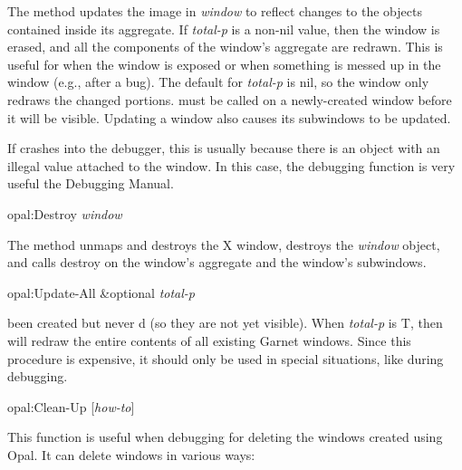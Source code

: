 The  method updates the image in {\it window} to reflect
changes to the objects contained inside its aggregate.  If {\it total-p} is a
non-{\sc nil} value, then the window is erased, and all the components of the
window's aggregate are redrawn.  This is useful for when the window is
exposed or when something is messed up in the window (e.g., after a bug).
The default for {\it total-p} is {\sc nil}, so the window only redraws the
changed portions.   must be called on a newly-created window
before it will be visible.  Updating a window also causes its subwindows to
be updated.

If  crashes into the debugger, this is usually because there is
an object with an illegal value attached to the window.  In this case, the
debugging function  is very useful\dashsee
the Debugging Manual.

\begin{programexample}
opal:Destroy {\it window}\value{method}
\end{programexample}

The  method unmaps and destroys the X
window, destroys the {\it window} object, and calls destroy on the
window's aggregate and the window's subwindows.

\begin{programexample}
opal:Update-All \&optional {\it total-p}\value{function}
\end{programexample}

been created but never d (so they are not yet visible).
When {\it total-p} is T, then  will redraw the entire
contents of all existing Garnet windows.  Since this procedure is expensive,
it should only be used in special situations, like during debugging.


\begin{programexample}
opal:Clean-Up [{\it how-to}]\value{function}
\end{programexample}

This function is useful when debugging for deleting the windows created using
Opal.  It can delete windows in various ways:

